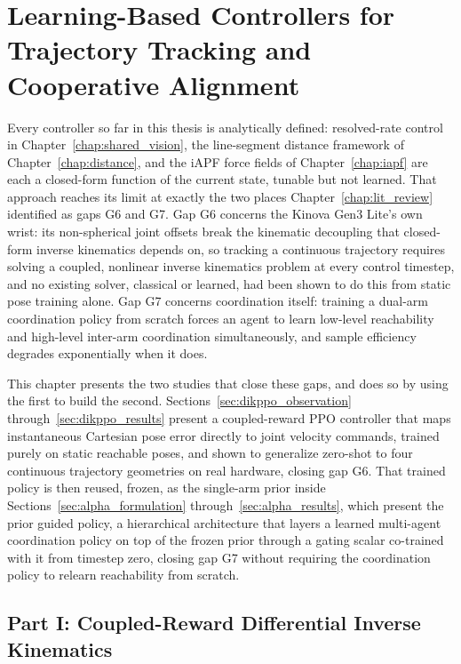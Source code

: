 \chapter{Learning-Based Controllers for Trajectory Tracking and Cooperative Alignment}
\label{chap:learned_control}

Every controller so far in this thesis is analytically defined: resolved-rate control in
Chapter~\ref{chap:shared_vision}, the line-segment distance framework of
Chapter~\ref{chap:distance}, and the iAPF force fields of Chapter~\ref{chap:iapf} are
each a closed-form function of the current state, tunable but not learned. That approach reaches
its limit at exactly the two places Chapter~\ref{chap:lit_review} identified as gaps G6 and G7.
Gap G6 concerns the Kinova Gen3 Lite's own wrist: its non-spherical joint offsets break the
kinematic decoupling that closed-form inverse kinematics depends on, so tracking a continuous
trajectory requires solving a coupled, nonlinear inverse kinematics problem at every control
timestep, and no existing solver, classical or learned, had been shown to do this from static pose
training alone. Gap G7 concerns coordination itself: training a dual-arm coordination policy from
scratch forces an agent to learn low-level reachability and high-level inter-arm coordination
simultaneously, and sample efficiency degrades exponentially when it does.

This chapter presents the two studies that close these gaps, and does so by using the first to
build the second. Sections~\ref{sec:dikppo_observation} through~\ref{sec:dikppo_results} present a
coupled-reward PPO controller that maps instantaneous Cartesian pose error directly to joint
velocity commands, trained purely on static reachable poses, and shown to generalize zero-shot to
four continuous trajectory geometries on real hardware, closing gap G6. That trained policy is then
reused, frozen, as the single-arm prior inside Sections~\ref{sec:alpha_formulation}
through~\ref{sec:alpha_results}, which present the prior guided policy, a hierarchical
architecture that layers a learned multi-agent coordination policy on top of the frozen prior
through a gating scalar co-trained with it from timestep zero, closing gap G7 without requiring the
coordination policy to relearn reachability from scratch.

\section*{Part I: Coupled-Reward Differential Inverse Kinematics}
{}

